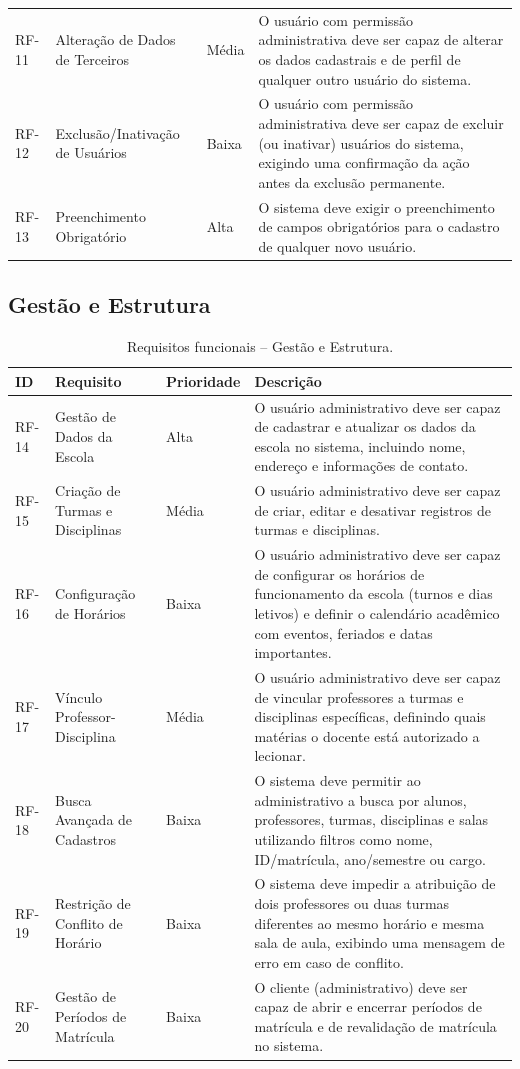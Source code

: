 \begin{xltabular}{\textwidth}{p{0.10\textwidth} p{0.20\textwidth} p{0.14\textwidth} X}
RF-11 & Alteração de Dados de Terceiros & Média & O usuário com permissão administrativa deve ser capaz de alterar os dados cadastrais e de perfil de qualquer outro usuário do sistema. \\
RF-12 & Exclusão/Inativação de Usuários & Baixa & O usuário com permissão administrativa deve ser capaz de excluir (ou inativar) usuários do sistema, exigindo uma confirmação da ação antes da exclusão permanente. \\
RF-13 & Preenchimento Obrigatório & Alta & O sistema deve exigir o preenchimento de campos obrigatórios para o cadastro de qualquer novo usuário. \\
\end{xltabular}

\subsection{Gestão e Estrutura}

\begin{table}[H]
\centering
\caption{Requisitos funcionais -- Gestão e Estrutura.}
\begin{tabularx}{\textwidth}{p{} p{} p{} X}
\toprule
\textbf{ID} & \textbf{Requisito} & \textbf{Prioridade} & \textbf{Descrição} \\
\midrule
RF-14 & Gestão de Dados da Escola & Alta & O usuário administrativo deve ser capaz de cadastrar e atualizar os dados da escola no sistema, incluindo nome, endereço e informações de contato. \\
RF-15 & Criação de Turmas e Disciplinas & Média & O usuário administrativo deve ser capaz de criar, editar e desativar registros de turmas e disciplinas. \\
RF-16 & Configuração de Horários & Baixa & O usuário administrativo deve ser capaz de configurar os horários de funcionamento da escola (turnos e dias letivos) e definir o calendário acadêmico com eventos, feriados e datas importantes. \\
RF-17 & Vínculo Professor-Disciplina & Média & O usuário administrativo deve ser capaz de vincular professores a turmas e disciplinas específicas, definindo quais matérias o docente está autorizado a lecionar. \\
RF-18 & Busca Avançada de Cadastros & Baixa & O sistema deve permitir ao administrativo a busca por alunos, professores, turmas, disciplinas e salas utilizando filtros como nome, ID/matrícula, ano/semestre ou cargo. \\
RF-19 & Restrição de Conflito de Horário & Baixa & O sistema deve impedir a atribuição de dois professores ou duas turmas diferentes ao mesmo horário e mesma sala de aula, exibindo uma mensagem de erro em caso de conflito. \\
RF-20 & Gestão de Períodos de Matrícula & Baixa & O cliente (administrativo) deve ser capaz de abrir e encerrar períodos de matrícula e de revalidação de matrícula no sistema. \\
\bottomrule
\end{tabularx}
\end{table}

